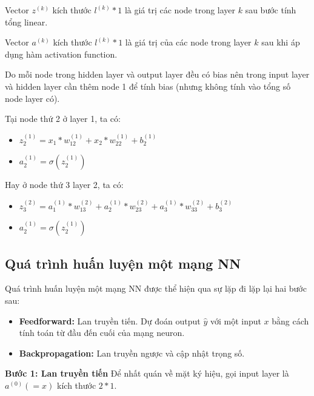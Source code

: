 Vector $z^{(k)}$ kích thước $l^{(k)} * 1$ là giá trị các node trong layer $k$ sau bước tính tổng linear.

Vector $a^{(k)}$ kích thước $l^{(k)} * 1$ là giá trị của các node trong layer $k$ sau khi áp dụng hàm activation function.



Do mỗi node trong hidden layer và output layer đều có bias nên trong input layer và hidden layer cần thêm node 1 để tính bias (nhưng không tính vào tổng số node layer có).

Tại node thứ 2 ở layer 1, ta có:

\begin{itemize}
\item $z_2^{(1)} =  x_1 * w_{12}^{(1)} +  x_2 * w_{22}^{(1)} + b_2^{(1)}$
\item $a_2^{(1)} = \sigma(z_2^{(1)})$
\end{itemize} 

Hay ở node thứ 3 layer 2, ta có:
\begin{itemize}
\item $z_3^{(2)} =  a_1^{(1)} * w_{13}^{(2)} + a_2^{(1)} * w_{23}^{(2)}  + a_3^{(1)} * w_{33}^{(2)} + b_3^{(2)}$
\item $a_2^{(1)} = \sigma(z_2^{(1)})$
\end{itemize} 

\subsection{Quá trình huấn luyện một mạng NN}

Quá trình huấn luyện một mạng NN được thể hiện qua sự lặp đi lặp lại hai bước sau:
\begin{itemize}
\item \textbf{Feedforward:} Lan truyền tiến. Dự đoán output $\hat{y}$ với một input $x$ bằng cách tính toán từ đầu đến cuối của mạng neuron.
\item \textbf{Backpropagation:} Lan truyền ngược và cập nhật trọng số.
\end{itemize}
\textbf{Bước 1: Lan truyền tiến}
Để nhất quán về mặt ký hiệu, gọi input layer là $a^{(0)} (=x)$ kích thước $2*1$.


